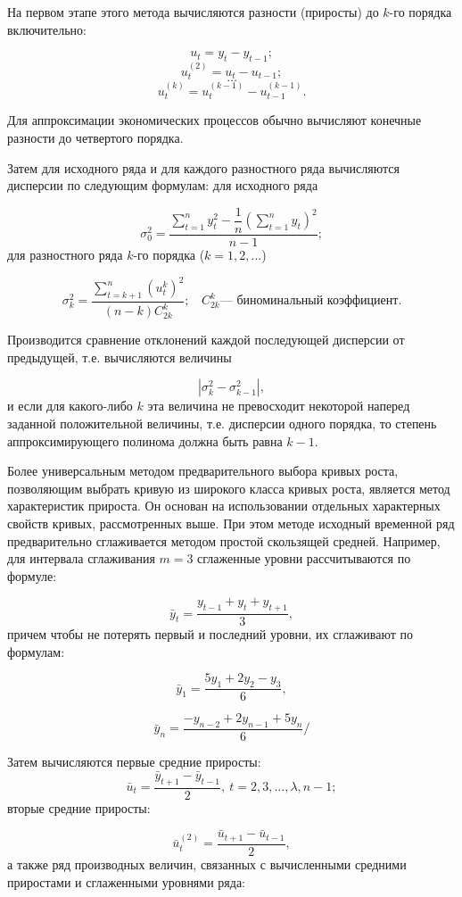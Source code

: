 На первом этапе этого метода вычисляются разности (приросты) до $k$-го порядка включительно:

\[ u_t =y_t - y_{t-1};\]
\[ u_t^{(2)} =u_t - u_{t-1}; \]
\[ \dots \]
\[u_t^{(k)} =u_t^{(k-1)} - u_{t-1}^{(k-1)}. \]

Для аппроксимации экономических процессов обычно вычисляют конечные разности до четвертого порядка.

Затем для исходного ряда и для каждого разностного ряда вычисляются дисперсии по следующим формулам: для исходного ряда

\[ \sigma_0^2 = \dfrac{\sum\limits_{t=1}^{n}y_t^2 - \dfrac{1}{n}\left(\sum\limits_{t=1}^{n}y_t\right)^2}{n-1}; \]
для разностного ряда $k$-го порядка ($k = 1, 2,...$)

\[ \sigma_k^2 =\dfrac{\sum\limits_{t=k+1}^{n}(u_t^k)^2}{(n-k)C_{2k}^k}; \ \ \ \ C_{2k}^k \text{--- биноминальный коэффициент.} \]

Производится сравнение отклонений каждой последующей дисперсии от предыдущей, т.е. вычисляются величины

\[ |\sigma_k^2 - \sigma_{k-1}^2|, \]
и если для какого-либо $k$ эта величина не превосходит некоторой наперед заданной положительной величины, т.е. дисперсии одного порядка, то степень аппроксимирующего полинома должна быть равна $k - 1$.

Более универсальным методом предварительного выбора кривых роста, позволяющим выбрать кривую из широкого класса кривых роста, является метод характеристик прироста. Он основан на использовании отдельных характерных свойств кривых, рассмотренных выше. При этом методе исходный временной ряд предварительно сглаживается методом простой скользящей средней. Например, для интервала сглаживания $m = 3$ сглаженные уровни рассчитываются по формуле:

\[ \bar{y}_t = \dfrac{y_{t-1} + y_t + y_{t+1}}{3}, \]
причем чтобы не потерять первый и последний уровни, их сглаживают по формулам:

\[ \bar{y}_1 = \dfrac{5y_{1} + 2y_2 - y_{3}}{6}, \]

\[ \bar{y}_n = \dfrac{-y_{n-2} + 2y_{n-1} + 5y_{n}}{6}/ \]

Затем вычисляются первые средние приросты:
\[ \bar{u}_t = \dfrac{\bar{y}_{t+1} - \bar{y}_{t-1}}{2},\ t=2,3,...,\lambda,n-1; \]
вторые средние приросты:
 
\[ \bar{u}_t^{(2)} = \dfrac{\bar{u}_{t+1} - \bar{u}_{t-1}}{2}, \]
 а также ряд производных величин, связанных с вычисленными средними приростами и сглаженными уровнями ряда:

